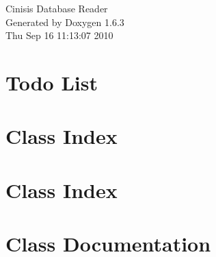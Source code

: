 \documentclass[a4paper]{book}
\begin{document}
\hypersetup{pageanchor=false}
\begin{titlepage}
\vspace*{7cm}
\begin{center}
{\Large Cinisis Database Reader }\\
\vspace*{1cm}
{\large Generated by Doxygen 1.6.3}\\
\vspace*{0.5cm}
{\small Thu Sep 16 11:13:07 2010}\\
\end{center}
\end{titlepage}
\clearemptydoublepage
{}
\tableofcontents
\clearemptydoublepage
{}
\hypersetup{pageanchor=true}
\chapter{Todo List}
\label{todo}
\hypertarget{todo}{}

\chapter{Class Index}

\chapter{Class Index}

\chapter{Class Documentation}





















\printindex
\end{document}
